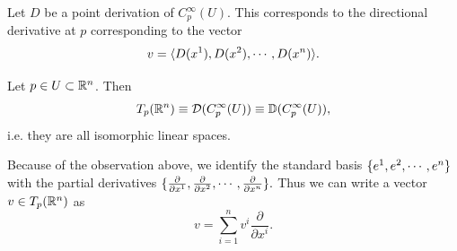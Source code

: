 \begin{observation}
	Let $ D $ be a point derivation of $ C_p^\infty (U) $. This corresponds to the directional derivative at $ p $ corresponding to the vector 
	\[ v = \langle D(x^1), D(x^2), \cdots, D(x^n) \rangle. \]
\end{observation}

\begin{observation}
	Let $ p \in U \subset \mathbb{R}^n $. Then 
	\[ T_p(\mathbb{R}^n) \equiv \mathcal{D}(C_p^\infty(U)) \equiv \mathbb{D}(C_p^\infty(U)), \]
	i.e. they are all isomorphic linear spaces.
\end{observation}

Because of the observation above, we identify the standard basis $ \{e^1, e^2, \cdots, e^n\} $ with the partial derivatives $ \{\frac{\partial}{\partial x^1}, \frac{\partial}{\partial x^2}, \cdots,\frac{\partial}{\partial x^n}\}. $ Thus we can write a vector $ v \in T_p(\mathbb{R}^n) $ as 
\[ v = \sum_{i=1}^{n} v^i \frac{\partial}{\partial x^i}. \]

